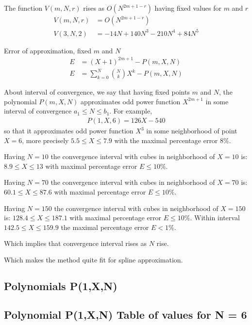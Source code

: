 \documentclass[12pt,letterpaper,oneside,reqno]{amsart}
\newcommand \polynomialP [4][P]{{#1}(#2,#3,#4)}
\begin{document}
    The function $V(m, N, r)$ rises as $O(N^{2m+1-r})$ having fixed values for $m$ and $r$
    \begin{align*}
        V(m, N, r) &= O(N^{2m+1-r}) \\
        V(3, N, 2) &= -14 N + 140 N^3 - 210 N^4 + 84 N^5
    \end{align*}

    Error of approximation, fixed $m$ and $N$
    \begin{align*}
        E &= (X+1)^{2m+1} - \polynomialP{m}{X}{N} \\
        E &= \sum_{k=0}^{N} \binom{N}{k} X^k - \polynomialP{m}{X}{N}
    \end{align*}

    About interval of convergence, we say that having fixed points $m$ and $N$,
    the polynomial $\polynomialP{m}{X}{N}$ approximates odd power function $X^{2m+1}$ in some interval
    of convergence $a_1 \leq N \leq b_1$.
    For example,
    \begin{align*}
        \polynomialP{1}{X}{6} = 126X - 540
    \end{align*}
    so that it approximates odd power function $X^3$ in some neighborhood of point $X=6$, more precisely
    $5.5 \leq X \leq 7.9$ with the maximal percentage error $8\%$.

    Having $N=10$ the convergence interval with cubes in neighborhood of $X=10$ is: $8.9 \leq X \leq 13$
    with maximal percentage error $E \leq 10\%$.

    Having $N=70$ the convergence interval with cubes in neighborhood of $X=70$ is: $60.1 \leq X \leq 87.6$
    with maximal percentage error $E \leq 10\%$.

    Having $N=150$ the convergence interval with cubes in neighborhood of $X=150$ is: $128.4 \leq X \leq 187.1$
    with maximal percentage error $E \leq 10\%$.
    Within interval $142.5 \leq X \leq 159.9$ the maximal percentage error $E < 1\%$.

    Which implies that convergence interval rises as $N$ rise.

    Which makes the method quite fit for spline approximation.

    \clearpage

    \subsection{Polynomials P(1,X,N)}
    

    \subsection{Polynomial P(1,X,N) Table of values for N = 6}
    
\end{document}
